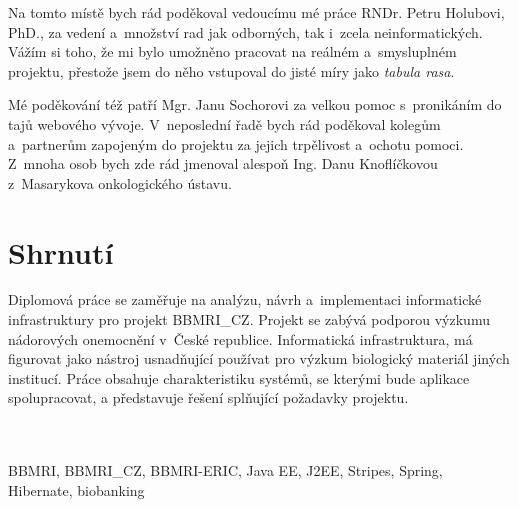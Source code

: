 \documentclass[11pt,draft,oneside]{fithesis2}
\newcommand{\ProjectName}{BBMRI\_CZ\xspace}
\begin{document}

\FrontMatter
\ThesisTitlePage

\begin{ThesisDeclaration}
  \DeclarationText
  \AdvisorName
\end{ThesisDeclaration}

\begin{ThesisThanks}
Na tomto místě bych rád poděkoval vedoucímu mé práce RNDr. Petru Holubovi, PhD., za vedení a~množství rad jak odborných, tak i~zcela neinformatických. Vážím si toho, že mi bylo umožněno pracovat na reálném a~smysluplném projektu, přestože jsem do něho vstupoval do jisté míry jako \textit{tabula rasa}.

Mé poděkování též patří Mgr. Janu Sochorovi za velkou pomoc s~pronikáním do tajů webového vývoje. 
V~neposlední řadě bych rád poděkoval kolegům a~partnerům zapojeným do projektu za jejich trpělivost a~ochotu pomoci. Z~mnoha osob bych zde rád jmenoval alespoň Ing. Danu Knoflíčkovou z~Masarykova onkologického ústavu. 
\end{ThesisThanks}




\chapter*{Shrnutí}
Diplomová práce se zaměřuje na analýzu, návrh a~implementaci informatické infrastruktury pro projekt \ProjectName. Projekt se zabývá podporou výzkumu nádorových onemocnění v~České republice. Informatická infrastr\-uktura, má figurovat jako nástroj usnadňující používat pro výzkum biologický materiál jiných institucí. Práce obsahuje charakteristiku systémů, se kterými bude aplikace spolupracovat, a představuje řešení splňující požadavky projektu.

\vspace{4em} 
 \\ \\ 
\noindent BBMRI, \ProjectName, BBMRI-ERIC, Java EE, J2EE, Stripes, Spring, Hibernate, biobanking
\end{document}
